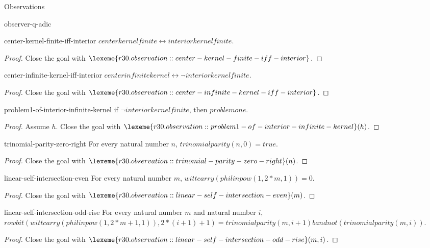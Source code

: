 \begin{lexlean}{Observations}
\begin{section}{observer-q-adic}
\begin{theorem}{center-kernel-finite-iff-interior}
\(centerkernelfinite ↔ interiorkernelfinite\).
\begin{proof}
Close the goal with \(\lexeme{r30.observation::center-kernel-finite-iff-interior}\).
\end{proof}
\end{theorem}

\begin{theorem}{center-infinite-kernel-iff-interior}
\(centerinfinitekernel ↔ ¬ interiorkernelfinite\).
\begin{proof}
Close the goal with \(\lexeme{r30.observation::center-infinite-kernel-iff-interior}\).
\end{proof}
\end{theorem}

\begin{theorem}{problem1-of-interior-infinite-kernel}
if \(¬ interiorkernelfinite\), then \(problemone\).
\begin{proof}
Assume \(h\).
Close the goal with \(\lexeme{r30.observation::problem1-of-interior-infinite-kernel}(h)\).
\end{proof}
\end{theorem}

\begin{theorem}{trinomial-parity-zero-right}
For every natural number \(n\), \(trinomialparity(n, 0) = true\).
\begin{proof}
Close the goal with \(\lexeme{r30.observation::trinomial-parity-zero-right}(n)\).
\end{proof}
\end{theorem}

\begin{theorem}{linear-self-intersection-even}
For every natural number \(m\), \(wittcarry(philinpow(1, 2 * m, 1)) = 0\).
\begin{proof}
Close the goal with \(\lexeme{r30.observation::linear-self-intersection-even}(m)\).
\end{proof}
\end{theorem}

\begin{theorem}{linear-self-intersection-odd-rise}
For every natural number \(m\) and natural number \(i\), \(rowbit(wittcarry(philinpow(1, 2 * m + 1, 1)), 2 * (i + 1) + 1) = trinomialparity(m, i + 1) band not(trinomialparity(m, i))\).
\begin{proof}
Close the goal with \(\lexeme{r30.observation::linear-self-intersection-odd-rise}(m, i)\).
\end{proof}
\end{theorem}


\end{section}
\end{lexlean}
